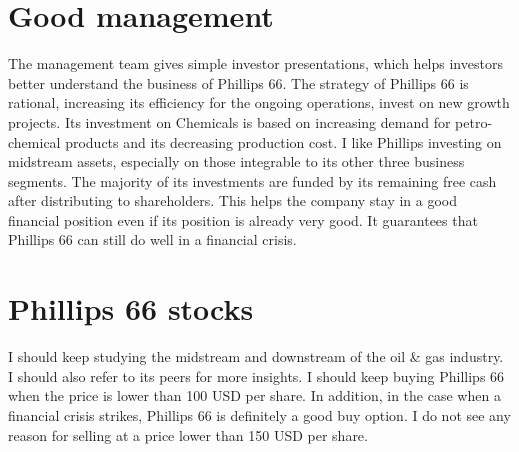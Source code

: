 \documentclass[11pt]{article}
\begin{document}
\section{Good management}
The management team gives simple investor presentations, which helps investors better understand the business of Phillips 66. The strategy of Phillips 66 is rational, increasing its efficiency for the ongoing operations, invest on new growth projects. Its investment on Chemicals is based on increasing demand for petro-chemical products and its decreasing production cost. I like Phillips investing on midstream assets, especially on those integrable to its other three business segments. The majority of its investments are funded by its remaining free cash after distributing to shareholders. This helps the company stay in a good financial position even if its position is already very good. It guarantees that Phillips 66 can still do well in a financial crisis.  

\section{Phillips 66 stocks}
I should keep studying the midstream and downstream of the oil \& gas industry. I should also refer to its peers for more insights. I should keep buying Phillips 66 when the price is lower than 100 USD per share. In addition, in the case when a financial crisis strikes, Phillips 66 is definitely a good buy option. I do not see any reason for selling at a price lower than 150 USD per share. 
\end{document}
